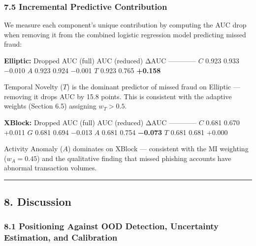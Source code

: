 \documentclass[
  11pt,
]{article}
\begin{document}
\subsubsection{7.5 Incremental Predictive
Contribution}\label{incremental-predictive-contribution}

We measure each component’s unique contribution by computing the AUC
drop when removing it from the combined logistic regression model
predicting missed fraud:

\textbf{Elliptic:} \textbar{} Dropped \textbar{} AUC (full) \textbar{}
AUC (reduced) \textbar{} ΔAUC \textbar{}
\textbar—\textbar—\textbar—\textbar—\textbar{} \textbar{} \(C\)
\textbar{} 0.923 \textbar{} 0.933 \textbar{} −0.010 \textbar{}
\textbar{} \(A\) \textbar{} 0.923 \textbar{} 0.924 \textbar{} −0.001
\textbar{} \textbar{} \(T\) \textbar{} 0.923 \textbar{} 0.765 \textbar{}
\textbf{+0.158} \textbar{}

Temporal Novelty (\(T\)) is the dominant predictor of missed fraud on
Elliptic — removing it drops AUC by 15.8 points. This is consistent with
the adaptive weights (Section 6.5) assigning \(w_T > 0.5\).

\textbf{XBlock:} \textbar{} Dropped \textbar{} AUC (full) \textbar{} AUC
(reduced) \textbar{} ΔAUC \textbar{}
\textbar—\textbar—\textbar—\textbar—\textbar{} \textbar{} \(C\)
\textbar{} 0.681 \textbar{} 0.670 \textbar{} +0.011 \textbar{}
\textbar{} \(G\) \textbar{} 0.681 \textbar{} 0.694 \textbar{} −0.013
\textbar{} \textbar{} \(A\) \textbar{} 0.681 \textbar{} 0.754 \textbar{}
\textbf{−0.073} \textbar{} \textbar{} \(T\) \textbar{} 0.681 \textbar{}
0.681 \textbar{} +0.000 \textbar{}

Activity Anomaly (\(A\)) dominates on XBlock — consistent with the MI
weighting (\(w_A = 0.45\)) and the qualitative finding that missed
phishing accounts have abnormal transaction volumes.

\begin{center}\rule{0.5\linewidth}{0.5pt}\end{center}

\subsection{8. Discussion}\label{discussion}

\subsubsection{8.1 Positioning Against OOD Detection, Uncertainty
Estimation, and
Calibration}\label{positioning-against-ood-detection-uncertainty-estimation-and-calibration}
\end{document}
